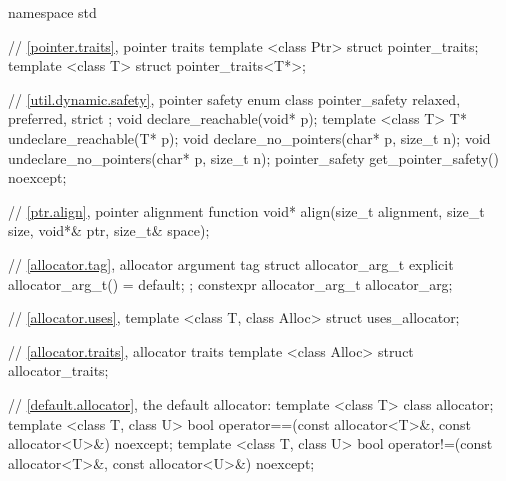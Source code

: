 %
\begin{codeblock}
namespace std {
  // \ref{pointer.traits}, pointer traits
  template <class Ptr> struct pointer_traits;
  template <class T> struct pointer_traits<T*>;

  // \ref{util.dynamic.safety}, pointer safety
  enum class pointer_safety { relaxed, preferred, strict };
  void declare_reachable(void* p);
  template <class T> T* undeclare_reachable(T* p);
  void declare_no_pointers(char* p, size_t n);
  void undeclare_no_pointers(char* p, size_t n);
  pointer_safety get_pointer_safety() noexcept;

  // \ref{ptr.align}, pointer alignment function
  void* align(size_t alignment, size_t size, void*& ptr, size_t& space);

  // \ref{allocator.tag}, allocator argument tag
  struct allocator_arg_t { explicit allocator_arg_t() = default; };
  constexpr allocator_arg_t allocator_arg{};

  // \ref{allocator.uses}, 
  template <class T, class Alloc> struct uses_allocator;

  // \ref{allocator.traits}, allocator traits
  template <class Alloc> struct allocator_traits;

  // \ref{default.allocator}, the default allocator:
  template <class T> class allocator;
  template <class T, class U>
    bool operator==(const allocator<T>&, const allocator<U>&) noexcept;
  template <class T, class U>
    bool operator!=(const allocator<T>&, const allocator<U>&) noexcept;

}
\end{codeblock}
